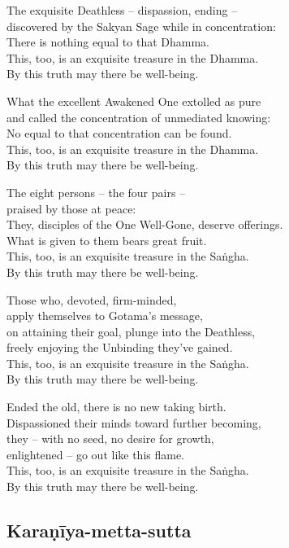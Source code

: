 %
The exquisite Deathless -- dispassion, ending --\\
discovered by the Sakyan Sage while in concentration:\\
There is nothing equal to that Dhamma.\\
This, too, is an exquisite treasure in the Dhamma.\\
By this truth may there be well-being.

\clearpage

%
What the excellent Awakened One extolled as pure\\
and called the concentration of unmediated knowing:\\
No equal to that concentration can be found.\\
This, too, is an exquisite treasure in the Dhamma.\\
By this truth may there be well-being.

%
The eight persons -- the four pairs --\\
praised by those at peace:\\
They, disciples of the One Well-Gone, deserve offerings.\\
What is given to them bears great fruit.\\
This, too, is an exquisite treasure in the Saṅgha.\\
By this truth may there be well-being.

%
Those who, devoted, firm-minded,\\
apply themselves to Gotama's message,\\
on attaining their goal, plunge into the Deathless,\\
freely enjoying the Unbinding they've gained.\\
This, too, is an exquisite treasure in the Saṅgha.\\
By this truth may there be well-being.

%
Ended the old, there is no new taking birth.\\
Dispassioned their minds toward further becoming,\\
they -- with no seed, no desire for growth,\\
enlightened -- go out like this flame.\\
This, too, is an exquisite treasure in the Saṅgha.\\
By this truth may there be well-being.

\clearpage

\subsection{Karaṇīya-metta-sutta}
\label{karaniyam-attha}

